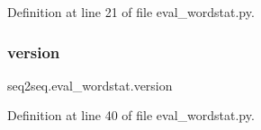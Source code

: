 Definition at line 21 of file eval\+\_\+wordstat.\+py.

\mbox{\label{namespaceseq2seq_1_1eval__wordstat_ac0b00d1f99bfdadc0535936a7b9042eb}} 
\subsubsection{\texorpdfstring{version}{version}}
{\footnotesize\ttfamily seq2seq.\+eval\+\_\+wordstat.\+version}



Definition at line 40 of file eval\+\_\+wordstat.\+py.

